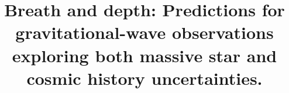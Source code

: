\documentclass[twocolumn]{aastex63}
\begin{document}
\title{Breath and depth: Predictions for  gravitational-wave observations exploring both  massive star and cosmic history uncertainties. }


\end{document}
